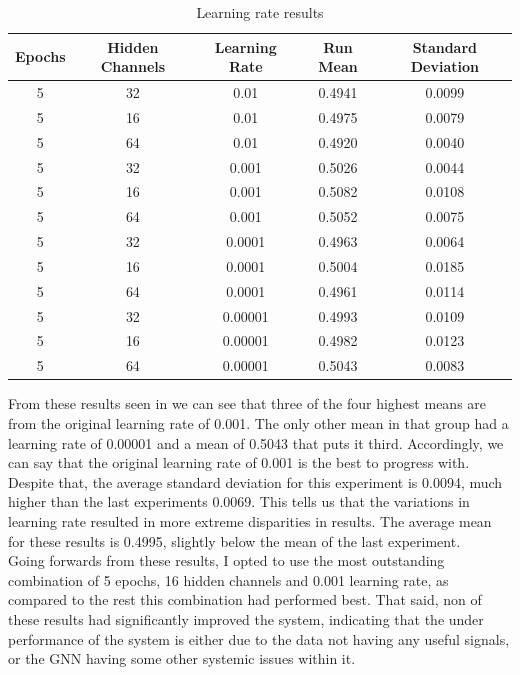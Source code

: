 \documentclass{l4proj}
\begin{document}
\begin{table}[h]
    \centering
    \caption{Learning rate results}
    \label{tab:Learnng_rate_results}
    \begin{tabular}{|c|c|c|c|c|}
        \hline
        \textbf{Epochs} & \textbf{Hidden Channels} & \textbf{Learning Rate} & \textbf{Run Mean} & \textbf{Standard Deviation} \\ \hline
        5 & 32 & 0.01 & 0.4941 & 0.0099 \\ \hline
        5 & 16 & 0.01 &  0.4975 & 0.0079 \\ \hline
        5 & 64 & 0.01 & 0.4920 & 0.0040 \\ \hline
        5 & 32 & 0.001 & 0.5026 & 0.0044 \\ \hline
        5 & 16 & 0.001 & 0.5082 & 0.0108 \\ \hline
        5 & 64 & 0.001 & 0.5052 & 0.0075 \\ \hline
        5 & 32 & 0.0001 & 0.4963 & 0.0064 \\ \hline
        5 & 16 & 0.0001 & 0.5004 & 0.0185 \\ \hline
        5 & 64 & 0.0001 & 0.4961 & 0.0114 \\ \hline
        5 & 32 & 0.00001 & 0.4993 & 0.0109 \\ \hline
        5 & 16 & 0.00001 & 0.4982 & 0.0123 \\ \hline
        5 & 64 & 0.00001 & 0.5043 & 0.0083 \\ \hline
    \end{tabular}
\end{table}

From these results seen in  we can see that three of the four highest means are from the original learning rate of 0.001. The only other mean in that group had a learning rate of 0.00001 and a mean of 0.5043 that puts it third. Accordingly, we can say that the original learning rate of 0.001 is the best to progress with. Despite that, the average standard deviation for this experiment is 0.0094, much higher than the last experiments 0.0069. This tells us that the variations in learning rate resulted in more extreme disparities in results. The average mean for these results is 0.4995, slightly below the mean of the last experiment. \\

Going forwards from these results, I opted to use the most outstanding combination of 5 epochs, 16 hidden channels and 0.001 learning rate, as compared to the rest this combination had performed best. That said, non of these results had significantly improved the system, indicating that the under performance of the system is either due to the data not having any useful signals, or the GNN having some other systemic issues within it. \\
\end{document}

